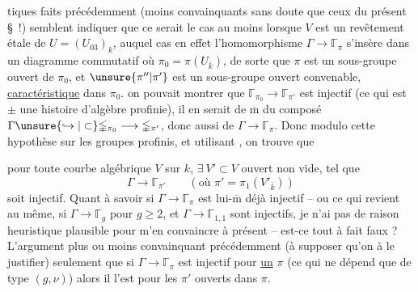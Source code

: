 
tiques faits précédemment (moins convainquants sans doute que ceux du présent
\S~!) semblent indiquer que ce serait
le cas au moins lorsque $V$ est un
revêtement étale de $U=(U_{03})_k$, auquel
cas en effet l'homomorphisme $\Gamma\longrightarrow\mathbb{\Gamma}_{\pi}$
s'insère dans un diagramme commutatif
où $\pi_0=\pi(U_{\bar k})$, de sorte que $\pi$ est un sous-groupe ouvert de
$\pi_0$, et $\unsure{\pi''|\pi'}$ est un
sous-groupe ouvert convenable, \uline{caractéristique}
dans $\pi_0$. \uline{} on pouvait montrer que
$\mathbb{\Gamma}_{\pi_0}\longrightarrow\mathbb{\Gamma}_{\pi'}$ est injectif
(ce qui est $\pm$ une histoire d'algèbre profinie), il en serait
de $\overline{\mathrm m}$ du composé
$\Gamma\unsure{\hookrightarrow|\subset}\mathbb{\Gamma}_{\pi_0}
\longrightarrow\mathbb{\Gamma}_{\pi'}$,
donc aussi de $\Gamma\longrightarrow\mathbb{\Gamma}_{\pi}$.
Donc modulo cette hypothèse sur les groupes profinis,
et utilisant , on trouve que

pour toute courbe algébrique $V$ sur $k$,
$\exists\ V'\subset V$ ouvert non vide, tel que
\[
\Gamma\longrightarrow\mathbb{\Gamma}_{\pi'}
\qquad (\text{où }\pi'=\pi_1(V'_{\bar{k}}))
\]
soit injectif. Quant à savoir si
$\Gamma\longrightarrow\mathbb{\Gamma}_{\pi}$ est lui-$\overline{\mathrm m}$ déjà injectif
-- ou  ce qui revient au même, si
$\Gamma\longrightarrow\mathbb{\Gamma}_g$ pour $g\geq 2$, et
$\Gamma\longrightarrow\mathbb{\Gamma}_{1,1}$ sont injectifs,
je n'ai pas de raison heuristique plausible pour m'en convaincre à présent
--  est-ce tout à fait faux ? L'argument
plus ou moins convainquant  précédemment (à supposer qu'on
 à le justifier)  seulement que si
$\Gamma\longrightarrow\mathbb{\Gamma}_{\pi}$ est injectif pour
\uline{un} $\pi$ (ce qui ne dépend que de  type $(g,\nu)$)
alors il l'est pour les $\pi'$ ouverts dans $\pi$.
 

